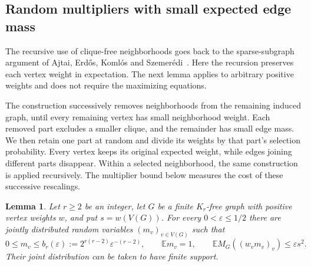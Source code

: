 \documentclass[11pt]{article}
\newtheorem{lemma}[theorem]{Lemma}
\theoremstyle{definition}
\theoremstyle{remark}
\numberwithin{equation}{section}
\begin{document}
\subsection{Random multipliers with small expected edge mass}

The recursive use of clique-free neighborhoods goes back to the
sparse-subgraph argument of Ajtai, Erd\H{o}s, Koml\'os and
Szemer\'edi~\cite[Section~3]{AEKS1981}. Here the recursion preserves
each vertex weight in expectation. The next lemma applies to arbitrary
positive weights and does not require the maximizing equations.

The construction successively removes neighborhoods from the remaining
induced graph, until every remaining vertex has small neighborhood weight.
Each removed part excludes a smaller clique, and the remainder has small
edge mass. We then retain one part at random and divide its weights by
that part's selection probability.
Every vertex keeps its original expected weight, while edges joining
different parts disappear. Within a selected neighborhood, the same
construction is applied recursively. The multiplier bound below measures
the cost of these successive rescalings.

\begin{lemma}\label{lem:sparse-multipliers}
Let $r\ge2$ be an integer, let $G$ be a finite $K_r$-free graph with positive vertex
weights $w$, and put $s=w(V(G))$.  For every $0<\varepsilon\le1/2$ there
are jointly distributed random variables $(m_v)_{v\in V(G)}$ such that
\begin{equation}\label{eq:sparse-multipliers}
 0\le m_v\le b_r(\varepsilon)
 :=2^{r(r-2)}\varepsilon^{-(r-2)},\qquad
 \mathbb E m_v=1,\qquad
 \mathbb E M_G((w_vm_v)_v)\le\varepsilon s^2.
\end{equation}
Their joint distribution can be taken to have finite support.
\end{lemma}
\end{document}
